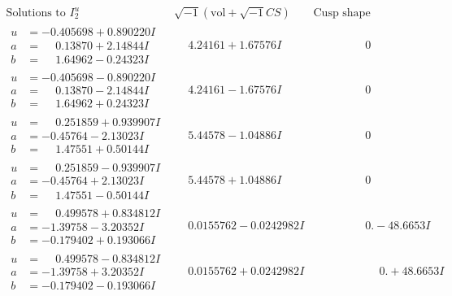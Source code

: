 \documentclass[1p]{elsarticle_modified}
\theoremstyle{definition}
\newcommand{\I}{\sqrt{-1}}
\begin{document}
$$\begin{array}{c|c|c}  
\text{Solutions to }I^u_{2}& \I (\text{vol} + \sqrt{-1}CS) & \text{Cusp shape}\\
 \hline 
\begin{aligned}
u &= -0.405698 + 0.890220 I \\
a &= \phantom{-}0.13870 + 2.14844 I \\
b &= \phantom{-}1.64962 - 0.24323 I\end{aligned}
 & \phantom{-}4.24161 + 1.67576 I & \phantom{-0.000000 } 0 \\ \hline\begin{aligned}
u &= -0.405698 - 0.890220 I \\
a &= \phantom{-}0.13870 - 2.14844 I \\
b &= \phantom{-}1.64962 + 0.24323 I\end{aligned}
 & \phantom{-}4.24161 - 1.67576 I & \phantom{-0.000000 } 0 \\ \hline\begin{aligned}
u &= \phantom{-}0.251859 + 0.939907 I \\
a &= -0.45764 - 2.13023 I \\
b &= \phantom{-}1.47551 + 0.50144 I\end{aligned}
 & \phantom{-}5.44578 - 1.04886 I & \phantom{-0.000000 } 0 \\ \hline\begin{aligned}
u &= \phantom{-}0.251859 - 0.939907 I \\
a &= -0.45764 + 2.13023 I \\
b &= \phantom{-}1.47551 - 0.50144 I\end{aligned}
 & \phantom{-}5.44578 + 1.04886 I & \phantom{-0.000000 } 0 \\ \hline\begin{aligned}
u &= \phantom{-}0.499578 + 0.834812 I \\
a &= -1.39758 - 3.20352 I \\
b &= -0.179402 + 0.193066 I\end{aligned}
 & \phantom{-}0.0155762 - 0.0242982 I & \phantom{-0.000000 } 0. - 48.6653 I \\ \hline\begin{aligned}
u &= \phantom{-}0.499578 - 0.834812 I \\
a &= -1.39758 + 3.20352 I \\
b &= -0.179402 - 0.193066 I\end{aligned}
 & \phantom{-}0.0155762 + 0.0242982 I & \phantom{-0.000000 -}0. + 48.6653 I \\ \hline\begin{aligned}

\end{aligned}
\end{array}$$
\end{document}
